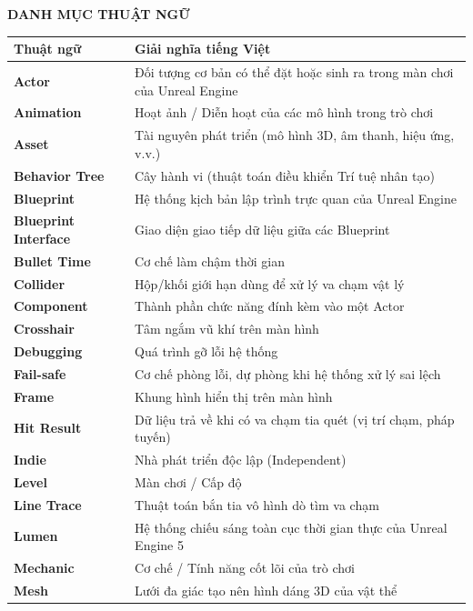 \documentclass[../DoAn.tex]{subfiles}
\begin{document}
\begin{center}
    \Large{\textbf{DANH MỤC THUẬT NGỮ}}\\
\end{center}
\vspace{1cm}

\begin{longtable}{l p{11.5cm}}
	\hline
   \textbf{Thuật ngữ}  & \textbf{Giải nghĩa tiếng Việt} \\ \hline 
	\textbf{Actor} & Đối tượng cơ bản có thể đặt hoặc sinh ra trong màn chơi của Unreal Engine \\
	\textbf{Animation} & Hoạt ảnh / Diễn hoạt của các mô hình trong trò chơi \\
	\textbf{Asset} & Tài nguyên phát triển (mô hình 3D, âm thanh, hiệu ứng, v.v.) \\
	\textbf{Behavior Tree} & Cây hành vi (thuật toán điều khiển Trí tuệ nhân tạo) \\
	\textbf{Blueprint} & Hệ thống kịch bản lập trình trực quan của Unreal Engine \\
	\textbf{Blueprint Interface} & Giao diện giao tiếp dữ liệu giữa các Blueprint \\
	\textbf{Bullet Time} & Cơ chế làm chậm thời gian \\
	\textbf{Collider} & Hộp/khối giới hạn dùng để xử lý va chạm vật lý \\
	\textbf{Component} & Thành phần chức năng đính kèm vào một Actor \\
	\textbf{Crosshair} & Tâm ngắm vũ khí trên màn hình \\
    \textbf{Debugging} & Quá trình gỡ lỗi hệ thống \\
    \textbf{Fail-safe} & Cơ chế phòng lỗi, dự phòng khi hệ thống xử lý sai lệch \\
    \textbf{Frame} & Khung hình hiển thị trên màn hình \\
    \textbf{Hit Result} & Dữ liệu trả về khi có va chạm tia quét (vị trí chạm, pháp tuyến) \\
    \textbf{Indie} & Nhà phát triển độc lập (Independent) \\
    \textbf{Level} & Màn chơi / Cấp độ \\
    \textbf{Line Trace} & Thuật toán bắn tia vô hình dò tìm va chạm \\
    \textbf{Lumen} & Hệ thống chiếu sáng toàn cục thời gian thực của Unreal Engine 5 \\
    \textbf{Mechanic} & Cơ chế / Tính năng cốt lõi của trò chơi \\
    \textbf{Mesh} & Lưới đa giác tạo nên hình dáng 3D của vật thể \\

\end{longtable}
\end{document}
